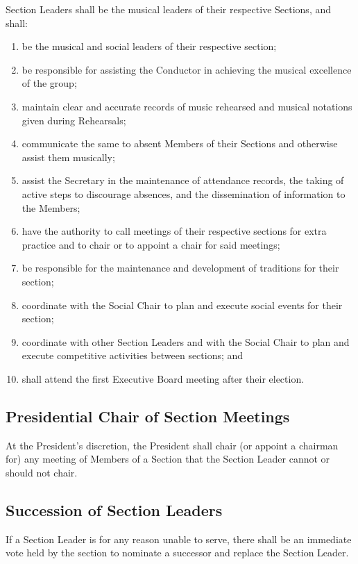 \documentclass{article}
\begin{document}
Section Leaders shall be the musical leaders of their respective Sections,
and shall:
\begin{enumerate}
\item be the musical and social leaders of their respective section;
\item be responsible for assisting the Conductor in achieving the musical
excellence of the group;
\item maintain clear and accurate records of music rehearsed and musical
notations given during Rehearsals;
\item communicate the same to absent Members of their Sections and otherwise
assist them musically;
\item assist the Secretary in the maintenance of attendance records, the
taking of active steps to discourage absences, and the dissemination
of information to the Members;
\item have the authority to call meetings of their respective sections for
extra practice and to chair or to appoint a chair for said meetings;
\item be responsible for the maintenance and development of traditions for
their section;
\item coordinate with the Social Chair to plan and execute social events
for their section;
\item coordinate with other Section Leaders and with the Social Chair to
plan and execute competitive activities between sections; and
\item shall attend the first Executive Board meeting after their election.
\end{enumerate}

\subsection{Presidential Chair of Section Meetings}

At the President's discretion, the President shall chair (or appoint a chairman
for) any meeting of Members of a Section that the Section Leader cannot
or should not chair.

\subsection{Succession of Section Leaders}

If a Section Leader is for any reason unable to serve, there shall
be an immediate vote held by the section to nominate a successor and
replace the Section Leader.
\end{document}
